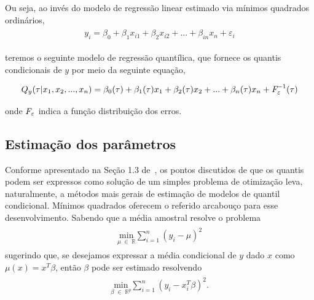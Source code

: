 \documentclass[paper=a4, fontsize=11pt]{scrartcl}
\numberwithin{equation}{section}		%
\numberwithin{figure}{section}			%
\numberwithin{table}{section}				%
\begin{document}
Ou seja, ao invés do modelo de regressão linear estimado via mínimos quadrados ordinários,
\vspace{-10pt}
\begin{align} 
	\begin{split}
	y_{i} = \beta_{0} + \beta_{1}x_{i1} + \beta_{2}x_{i2} + ... + \beta_{in}x_{n} + \varepsilon_{i} \label{eq:1}
	\end{split}					
\end{align}

{\parindent0pt teremos o seguinte modelo de regressão quantílica, que fornece os quantis condicionais de $y$ por meio da seguinte equação,}

\vspace{-10pt}
\begin{align} 
	\begin{split}
	Q_{y}(\tau|x_{1}, x_{2}, ..., x_{n}) = \beta_{0}(\tau) + \beta_{1}(\tau)x_{1} + \beta_{2}(\tau)x_{2} + ... + \beta_{n}(\tau)x_{n} + \emph{F}^{-1}_\varepsilon(\tau) \label{eq:2}
	\end{split}					
\end{align}

{\parindent0pt onde $\emph{F}_\varepsilon$ indica a função distribuição dos erros.}


\subsection{Estimação dos parâmetros}\label{estimacao}
Conforme apresentado na Seção 1.3 de~\cite{koenker2005quantile}, os pontos discutidos de que os quantis podem ser expressos como solução de um simples problema de otimização leva, naturalmente, a métodos mais gerais de estimação de modelos de quantil condicional. Mínimos quadrados oferecem o referido arcabouço para esse desenvolvimento. Sabendo que a média amostral resolve o problema
\vspace{-10pt}
\begin{align} 
	\begin{split}
	\underset{\mu \; \in \; \mathbb{R} }{\text{min}} \sum_{i=1}^{n} (y_{i}-\mu)^{2} \label{eq:3}
	\end{split}					
\end{align}
{\parindent0pt sugerindo que, se desejamos expressar a média condicional de $y$ dado $x$ como $\mu(x)=x^{T}\beta$, então $\beta$ pode ser estimado resolvendo}
\vspace{-10pt}
\begin{align} 
	\begin{split}
	\underset{\beta \; \in \; \mathbb{R}^p }{\text{min}} \sum_{i=1}^{n} (y_{i}-x_{i}^{T}\beta)^{2}. \label{eq:4}
	\end{split}					
\end{align}
\end{document}
